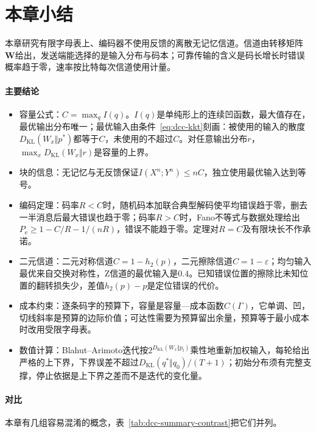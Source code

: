 \section{本章小结}
\label{sec:dcc-summary}

本章研究有限字母表上、编码器不使用反馈的离散无记忆信道。信道由转移矩阵$\bm{W}$给出，发送端能选择的是输入分布与码本；可靠传输的含义是码长增长时错误概率趋于零，速率按比特每次信道使用计量。

\paragraph{主要结论}
\begin{itemize}
 \item 容量公式：$C=\max_qI(q)$。$I(q)$是单纯形上的连续凹函数，最大值存在，最优输出分布唯一；最优输入由条件~\eqref{eq:dcc-kkt}刻画：被使用的输入的散度$D_{\mathrm{KL}}(W_x\Vert p^{*})$都等于$C$，未使用的不超过$C$。对任意输出分布$r$，$\max_xD_{\mathrm{KL}}(W_x\Vert r)$是容量的上界。

 \item 块的信息：无记忆与无反馈保证$I(X^n;Y^n)\leq nC$，独立使用最优输入达到等号。

 \item 编码定理：码率$R<C$时，随机码本加联合典型解码使平均错误趋于零，删去一半消息后最大错误也趋于零；码率$R>C$时，Fano不等式与数据处理给出$P_{\mathrm{e}}\geq1-C/R-1/(nR)$，错误不能趋于零。定理对$R=C$及有限块长不作承诺。

 \item 二元信道：二元对称信道$C=1-h_2(p)$，二元擦除信道$C=1-\varepsilon$；均匀输入最优来自交换对称性，Z信道的最优输入是$0.4$。已知错误位置的擦除比未知位置的翻转损失少，差值$h_2(p)-p$是定位错误的代价。

 \item 成本约束：逐条码字的预算下，容量是容量—成本函数$C(\Gamma)$，它单调、凹，切线斜率是预算的边际价值；可达性需要为预算留出余量，预算等于最小成本时改用受限字母表。

 \item 数值计算：Blahut–Arimoto迭代按$2^{D_{\mathrm{KL}}(W_x\Vert p_t)}$乘性地重新加权输入，每轮给出严格的上下界，下界误差不超过$D_{\mathrm{KL}}(q^{*}\Vert q_0)/(T+1)$；初始分布须有完整支撑，停止依据是上下界之差而不是迭代的变化量。
\end{itemize}

\paragraph{对比}
本章有几组容易混淆的概念，表~\ref{tab:dcc-summary-contrast}把它们并列。

